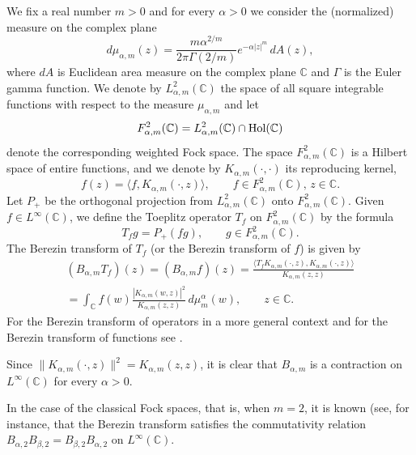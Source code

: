 \documentclass[12pt]{amsart}
\numberwithin{equation}{section}
\theoremstyle{plain}
\numberwithin{equation}{section}
\begin{document}
We fix a real number $m>0$ and for every $\alpha >0$ we consider the (normalized) measure on the complex plane  
$$
d\mu_{\alpha,m}(z)= \frac{m\alpha^{2/m}}{2\pi\Gamma(2/m)}e^{-\alpha |z|^m}\,dA(z),
$$ 
where  $dA$ is Euclidean area measure on the complex plane $\mathbb C$ and $\Gamma$ is the Euler gamma function.
We denote by $L_{\alpha,m}^{2}(\mathbb C)$ the space of all square integrable functions with respect to the measure $\mu_{\alpha,m}$ and let 
$$
F_{\alpha,m}^{2}(\mathbb C)=L_{\alpha,m}^{2}(\mathbb C)\cap {\rm Hol}(\mathbb C)
$$
denote the corresponding weighted Fock space. The space $F_{\alpha,m}^{2}(\mathbb C)$ is a Hilbert space of entire functions, and we denote by $K_{\alpha,m}(\cdot,\cdot)$ its reproducing kernel,
$$
f(z)=\langle f,K_{\alpha,m}(\cdot,z) \rangle,\qquad f\in F_{\alpha,m}^{2}(\mathbb C),\, z\in \mathbb C.
$$ 
Let $P_+$ be the orthogonal projection from $L_{\alpha,m}^{2}(\mathbb C)$ onto $F_{\alpha,m}^{2}(\mathbb C)$. Given $f\in L^{\infty}(\mathbb C)$, we define the Toeplitz operator $T_f$ on $F_{\alpha,m}^{2}(\mathbb C)$ by the formula 
$$
T_fg=P_+(fg),\qquad g\in F_{\alpha,m}^{2}(\mathbb C).
$$
The Berezin transform of $T_f$ (or the Berezin transform of $f$) is given by
\begin{multline*}
(B_{\alpha,m}T_f)(z)=(B_{\alpha,m}f)(z)=\frac{\langle T_fK_{\alpha,m}(\cdot,z),K_{\alpha,m}(\cdot,z)\rangle}{K_{\alpha,m}(z,z)}
\\=\displaystyle\int_{\mathbb C}f(w) \frac{|K_{\alpha,m}(w,z)|^2}{K_{\alpha,m}(z,z)}\,d\mu_{m}^{\alpha}(w), \qquad z\in\mathbb C.
\end{multline*}%
For the Berezin transform of operators in a more general context and for the Berezin transform of functions see \cite{B,E1,E2,Z}.

Since $\|K_{\alpha,m}(\cdot,z) \|^2=K_{\alpha,m}(z,z)$, it is clear that $B_{\alpha,m}$ is a contraction on $L^{\infty}(\mathbb C) $ %
for every $\alpha>0$.

In the case of the classical Fock spaces, that is, when $m=2$, it is known (see, for instance, \cite[Chapter 2]{Z} that the Berezin transform satisfies the commutativity relation $B_{\alpha,2}B_{\beta,2}=B_{\beta,2}B_{\alpha,2}$ on 
$L^{\infty}(\mathbb C)$.
 
 
\end{document}
